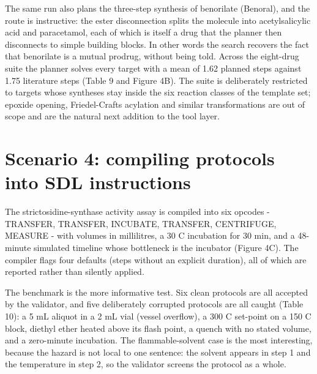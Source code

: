 The same run also plans the three-step synthesis of ben\-or\-i\-late (Benoral), and the route is instructive: the ester disconnection splits the molecule into acetylsalicylic acid and paracetamol, each of which is itself a drug that the planner then disconnects to simple building blocks. In other words the search recovers the fact that ben\-or\-i\-late is a mutual prodrug, without being told. Across the eight-drug suite the planner solves every target with a mean of 1.62 planned steps against 1.75 literature steps (Table 9 and Figure 4B). The suite is deliberately restricted to targets whose syntheses stay inside the six reaction classes of the template set; epoxide opening, Friedel-Crafts acylation and similar transformations are out of scope and are the natural next addition to the tool layer.

\section{Scenario 4: compiling protocols into SDL instructions}

The stric\-to\-si\-dine-synthase activity assay is compiled into six opcodes - TRANSFER, TRANSFER, INCUBATE, TRANSFER, CENTRIFUGE, MEASURE - with volumes in millilitres, a 30 C incubation for 30 min, and a 48-minute simulated timeline whose bottleneck is the incubator (Figure 4C). The compiler flags four defaults (steps without an explicit duration), all of which are reported rather than silently applied.

The benchmark is the more informative test. Six clean protocols are all accepted by the validator, and five deliberately corrupted protocols are all caught (Table 10): a 5 mL aliquot in a 2 mL vial (vessel overflow), a 300 C set-point on a 150 C block, diethyl ether heated above its flash point, a quench with no stated volume, and a zero-minute incubation. The flammable-solvent case is the most interesting, because the hazard is not local to one sentence: the solvent appears in step 1 and the temperature in step 2, so the validator screens the protocol as a whole.

